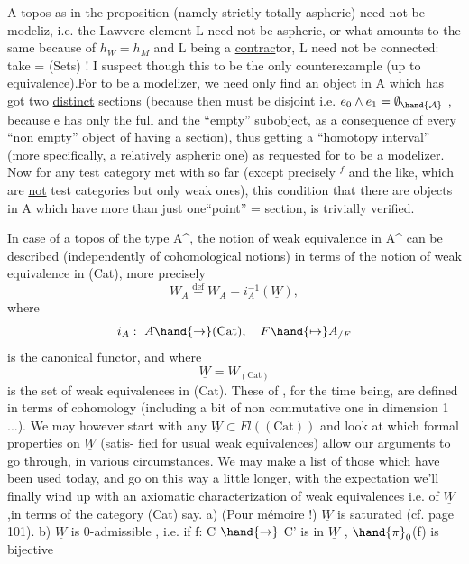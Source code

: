 
A topos  as in the proposition (namely strictly totally aspheric)
need not be  modeliz, i.e.  the Lawvere element L need not
be aspheric, or what amounts to the same because of $h_W = h_M$ and L being
 a \uline{contrac}tor, L need not be connected: take  = (Sets) ! I suspect
 though this to be the only counterexample (up to equivalence)\hand{(*)}.For  to
be a modelizer, we need only find an object in A which has got two
\uline{distinct} sections (because then  must be disjoint i.e. $e_0 \wedge e_1 = \emptyset_{\hand{\mathcal{A}}}$ ,
because e has only the full and the ``empty'' subobject, as a consequence
of every ``non empty'' object of  having a section), thus getting a
``homotopy interval'' (more specifically, a  relatively aspheric   one)
as requested for  to be a modelizer. Now for any  test category met
with so far (except precisely \hand{$\Delta$}$^f$ and the like, which are  \uline{not}
test categories but only weak ones), this condition that there are objects
in A which have more than just one``point'' \hand{(}= section\hand{)}, is trivially
verified.

In case of a topos of the type A\^{}, the notion of weak equivalence in
A\^{} can be described (independently of cohomological notions) in terms of
the notion of weak equivalence in (Cat), more precisely
\[ W_A \overset{\text{def}}{=} W_{A\hat{}} = i_A^{-1}(\underline{W}) , \]
where
\[ i_A :\ A\hat{} \hand{\to} (\mathrm{Cat}) , \quad F \hand{\mapsto} A_{/F} \]
is the canonical functor, and where
\[ \underline{W} = W_{(\mathrm{Cat})} \]
is the set of weak equivalences in (Cat). These of , for the time
being, are defined in terms of  cohomology (including
a bit of non commutative one in dimension 1 ...). We may however start
with any $\underline{W} \subset Fl((\mathrm{Cat}))$ and look at which formal properties on $\underline{W}$ (satis-%
fied for usual weak equivalences) allow our arguments to go through, in
various circumstances. We may make a list of those which have been used
today, and go on this way a little longer, with the expectation we'll
finally wind up with an axiomatic characterization of weak equivalences
i.e. of $\underline{W}$,in terms of the category (Cat)\unsure{,} say.
a) (Pour mémoire !) $\underline{W}$ is saturated (cf. page 101).
b) $\underline{W}$ is 0-admissible , i.e. if f: C $\hand{\to}$ C' is in $\underline{W}$ , $\hand{\pi}_0$(f) is bijective

